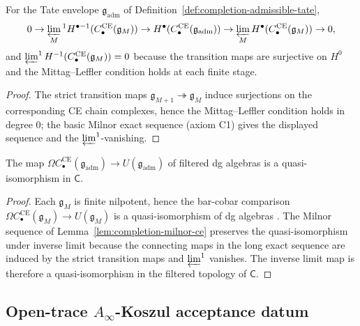\begin{lem}
\label{lem:completion-milnor-ce}
For the Tate envelope \(\mathfrak g_{\mathrm{adm}}\) of
Definition~\ref{def:completion-admissible-tate},
\[
  0\to\varprojlim_M{}^1H^{\bullet-1}(C^{\mathrm{CE}}_\bullet(\mathfrak g_M))
   \to H^\bullet(C^{\mathrm{CE}}_\bullet(\mathfrak g_{\mathrm{adm}}))
   \to\varprojlim_M H^\bullet(C^{\mathrm{CE}}_\bullet(\mathfrak g_M))
   \to 0,
\]
and \(\varprojlim^1H^{-1}(C^{\mathrm{CE}}_\bullet(\mathfrak g_M))=0\)
because the transition maps are surjective on \(H^0\) and the Mittag--Leffler
condition holds at each finite stage.
\end{lem}

\begin{proof}
The strict transition maps
\(\mathfrak g_{M+1}\twoheadrightarrow\mathfrak g_M\) induce
surjections on the corresponding CE chain complexes, hence the
Mittag--Leffler condition holds in degree \(0\); the basic Milnor
exact sequence (axiom C1) gives the displayed sequence and the
\(\varprojlim^1\)-vanishing.
\end{proof}

\begin{thm}
\label{thm:completion-tate-bar-cobar}
The map
\(\Omega C^{\mathrm{CE}}_\bullet(\mathfrak g_{\mathrm{adm}})\to
U(\mathfrak g_{\mathrm{adm}})\) of filtered dg algebras is a
quasi-isomorphism in \(\mathsf C\).
\end{thm}

\begin{proof}
Each \(\mathfrak g_M\) is finite nilpotent, hence the bar-cobar
comparison \(\Omega C^{\mathrm{CE}}_\bullet(\mathfrak g_M)\to
U(\mathfrak g_M)\) is a quasi-isomorphism of dg algebras
\cite{quillen-htpy}\cite{kontsevich-dq}.
The Milnor sequence of
Lemma~\ref{lem:completion-milnor-ce} preserves the quasi-isomorphism
under inverse limit because the connecting maps in the long exact
sequence are induced by the strict transition maps and
\(\varprojlim^1\) vanishes.  The inverse limit map is therefore a
quasi-isomorphism in the filtered topology of \(\mathsf C\).
\end{proof}

\subsection{\texorpdfstring{Open-trace \(A_\infty\)-Koszul acceptance datum}{Open-trace A--Koszul acceptance datum}}
\label{ssec:completion-ainfty-koszul}

